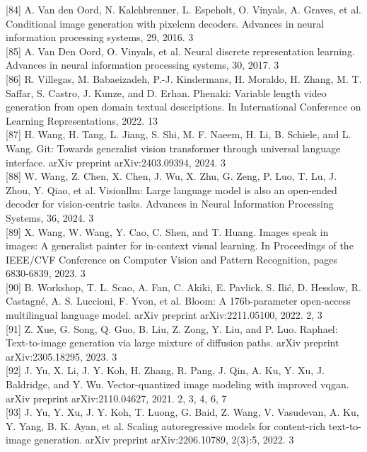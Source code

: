 \documentclass{article}
\begin{document}
[84] A. Van den Oord, N. Kalchbrenner, L. Espeholt, O. Vinyals, A. Graves, et al. Conditional image generation with pixelcnn decoders. Advances in neural information processing systems, 29, 2016. 3\\[0pt]
[85] A. Van Den Oord, O. Vinyals, et al. Neural discrete representation learning. Advances in neural information processing systems, 30, 2017. 3\\[0pt]
[86] R. Villegas, M. Babaeizadeh, P.-J. Kindermans, H. Moraldo, H. Zhang, M. T. Saffar, S. Castro, J. Kunze, and D. Erhan. Phenaki: Variable length video generation from open domain textual descriptions. In International Conference on Learning Representations, 2022. 13\\[0pt]
[87] H. Wang, H. Tang, L. Jiang, S. Shi, M. F. Naeem, H. Li, B. Schiele, and L. Wang. Git: Towards generalist vision transformer through universal language interface. arXiv preprint arXiv:2403.09394, 2024. 3\\[0pt]
[88] W. Wang, Z. Chen, X. Chen, J. Wu, X. Zhu, G. Zeng, P. Luo, T. Lu, J. Zhou, Y. Qiao, et al. Visionllm: Large language model is also an open-ended decoder for vision-centric tasks. Advances in Neural Information Processing Systems, 36, 2024. 3\\[0pt]
[89] X. Wang, W. Wang, Y. Cao, C. Shen, and T. Huang. Images speak in images: A generalist painter for in-context visual learning. In Proceedings of the IEEE/CVF Conference on Computer Vision and Pattern Recognition, pages 6830-6839, 2023. 3\\[0pt]
[90] B. Workshop, T. L. Scao, A. Fan, C. Akiki, E. Pavlick, S. Ilić, D. Hesslow, R. Castagné, A. S. Luccioni, F. Yvon, et al. Bloom: A 176b-parameter open-access multilingual language model. arXiv preprint arXiv:2211.05100, 2022. 2, 3\\[0pt]
[91] Z. Xue, G. Song, Q. Guo, B. Liu, Z. Zong, Y. Liu, and P. Luo. Raphael: Text-to-image generation via large mixture of diffusion paths. arXiv preprint arXiv:2305.18295, 2023. 3\\[0pt]
[92] J. Yu, X. Li, J. Y. Koh, H. Zhang, R. Pang, J. Qin, A. Ku, Y. Xu, J. Baldridge, and Y. Wu. Vector-quantized image modeling with improved vqgan. arXiv preprint arXiv:2110.04627, 2021. 2, 3, 4, 6, 7\\[0pt]
[93] J. Yu, Y. Xu, J. Y. Koh, T. Luong, G. Baid, Z. Wang, V. Vasudevan, A. Ku, Y. Yang, B. K. Ayan, et al. Scaling autoregressive models for content-rich text-to-image generation. arXiv preprint arXiv:2206.10789, 2(3):5, 2022. 3\\[0pt]
\end{document}
